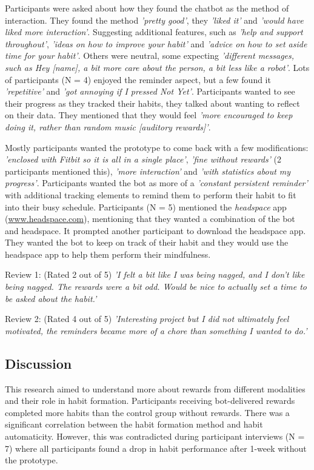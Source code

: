 Participants were asked about how they found the chatbot as the method of interaction. They found the method \textit{'pretty good'}, they \textit{'liked it'} and \textit{'would have liked more interaction'}. Suggesting additional features, such as \textit{'help and support throughout'}, \textit{'ideas on how to improve your habit'} and \textit{'advice on how to set aside time for your habit'}. Others were neutral, some expecting \textit{'different messages, such as Hey [name], a bit more care about the person, a bit less like a robot'}. Lots of participants (N = 4) enjoyed the reminder aspect, but a few found it \textit{'repetitive'} and \textit{'got annoying if I pressed Not Yet'}. Participants wanted to see their progress as they tracked their habits, they talked about wanting to reflect on their data. They mentioned that they would feel \textit{'more encouraged to keep doing it, rather than random music [auditory rewards]'}.


Mostly participants wanted the prototype to come back with a few modifications: \textit{'enclosed with Fitbit so it is all in a single place'}, \textit{'fine without rewards'} (2 participants mentioned this), \textit{'more interaction'} and \textit{'with statistics about my progress'}. Participants wanted the bot as more of a \textit{'constant persistent reminder'} with additional tracking elements to remind them to perform their habit to fit into their busy schedule. Participants (N = 5) mentioned the \textit{headspace} app (\url{www.headspace.com}), mentioning that they wanted a combination of the bot and headspace. It prompted another participant to download the headspace app. They wanted the bot to keep on track of their habit and they would use the headspace app to help them perform their mindfulness.

Review 1: (Rated 2 out of 5) \textit{'I felt a bit like I was being nagged, and I don't like being nagged. The rewards were a bit odd. Would be nice to actually set a time to be asked about the habit.'}


Review 2: (Rated 4 out of 5) \textit{'Interesting project but I did not ultimately feel motivated, the reminders became more of a chore than something I wanted to do.'}


\subsection{Discussion}
This research aimed to understand more about rewards from different modalities and their role in habit formation. Participants receiving bot-delivered rewards completed more habits than the control group without rewards. There was a significant correlation between the habit formation method and habit automaticity. However, this was contradicted during participant interviews (N = 7) where all participants found a drop in habit performance after 1-week without the prototype.

